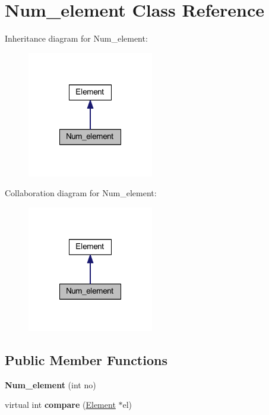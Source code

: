 \hypertarget{class_num__element}{\section{Num\-\_\-element Class Reference}
\label{d8/d1c/class_num__element}
}


Inheritance diagram for Num\-\_\-element\-:\nopagebreak
\begin{figure}[H]
\begin{center}
\leavevmode
\includegraphics[width=156pt]{d0/daf/class_num__element__inherit__graph}
\end{center}
\end{figure}


Collaboration diagram for Num\-\_\-element\-:\nopagebreak
\begin{figure}[H]
\begin{center}
\leavevmode
\includegraphics[width=156pt]{d7/d29/class_num__element__coll__graph}
\end{center}
\end{figure}
\subsection*{Public Member Functions}
\begin{DoxyCompactItemize}
\item 
\hypertarget{class_num__element_ad99dd33f81ad3fe59c219bee2bbbb951}{{\bfseries Num\-\_\-element} (int no)}\label{d8/d1c/class_num__element_ad99dd33f81ad3fe59c219bee2bbbb951}

\item 
\hypertarget{class_num__element_ac4a144cd601fc276efb1b3141ddcee65}{virtual int {\bfseries compare} (\hyperlink{class_element}{Element} $\ast$el)}\label{d8/d1c/class_num__element_ac4a144cd601fc276efb1b3141ddcee65}

\end{DoxyCompactItemize}
